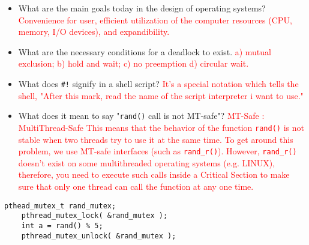 \documentclass[10pt,landscape]{article}
\newcommand{\answer}[1]{\textcolor{red}{#1}}
\begin{document}
\begin{multicols}{4}
\begin{itemize}
    \item What are the main goals today in the design of operating systems? \answer{Convenience for user, efficient utilization of the computer resources (CPU, memory, I/O devices), and expandibility.}
    \item What are the necessary conditions for a deadlock to exist.  \answer{a) mutual exclusion; b) hold and wait; c) no preemption d) circular wait.}
    \item What does \verb$#!$ signify in a shell script? \answer{It's a special notation which tells the shell, "After this mark, read the name of the script interpreter i want to use."}
    \item What does it mean to say "\verb$rand()$ call is not MT-safe"? \answer{MT-Safe : MultiThread-Safe This means that the behavior of the function \texttt{rand()} is not stable when two threads try to use it at the same time. To get around this problem, we use MT-safe interfaces (such as \texttt{rand\_r()}).  However, \texttt{rand\_r()} doesn't exist on some multithreaded operating systems (e.g. LINUX), therefore, you need to execute such calls inside a Critical Section to make sure that only one thread can call the function at any one time.}
\end{itemize}

\begin{lstlisting}[style=cC++]
    pthead_mutex_t rand_mutex;
    pthread_mutex_lock( &rand_mutex );
    int a = rand() % 5;
    pthread_mutex_unlock( &rand_mutex );
\end{lstlisting}


\end{multicols}
\end{document}

